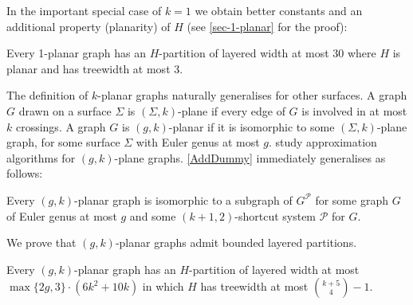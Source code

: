 \documentclass{patmorin}
\newcommand{\PP}{\mathcal{P}}
\begin{document}

In the important special case of $k=1$ we obtain better constants and an additional property (planarity) of $H$ (see \cref{sec-1-planar} for the proof):

\begin{thm}
\label{1-planar}
Every 1-planar graph has an $H$-partition of layered width at most 30 where $H$ is planar and has treewidth at most 3.
\end{thm}


The definition of $k$-planar graphs naturally generalises for other surfaces. A graph $G$ drawn on a surface $\Sigma$ is $(\Sigma,k)$-plane if every edge of $G$ is involved in at most $k$ crossings.  A graph $G$ is $(g,k)$-planar if it is isomorphic to some $(\Sigma,k)$-plane graph, for some surface $\Sigma$ with Euler genus at most $g$. \citet{grigoriev.bodlaender:algorithms} study approximation algorithms for $(g,k)$-plane graphs.
\cref{AddDummy} immediately generalises as follows:

\begin{obs}
\label{gAddDummy}
Every $(g,k)$-planar graph is isomorphic to a subgraph of $G^\PP$ for some graph $G$ of Euler genus at most $g$ and some $(k+1,2)$-shortcut system $\PP$ for $G$. 
\end{obs}

We prove that $(g,k)$-planar graphs admit bounded layered partitions. 

\begin{thm}
\label{g-k-planar}
Every $(g,k)$-planar graph has an $H$-partition of layered width at most 
$\max\{2g,3\}\cdot(6k^2 + 10k)$ in which $H$ has treewidth at most $\binom{k+5}{4}-1$.
\end{thm}
\end{document}
